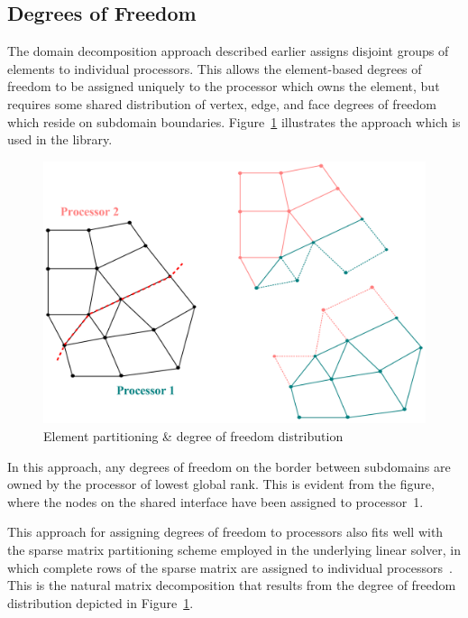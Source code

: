 \subsection{Degrees of Freedom\label{sec:dof_distribution_parallel}}
The domain decomposition approach described earlier assigns disjoint
groups of elements to individual processors.  This allows the
element-based degrees of freedom to be assigned uniquely to the
processor which owns the element, but requires some shared
distribution of vertex, edge, and face degrees of freedom which reside on subdomain boundaries.
Figure~\ref{fig:dofs_dd} illustrates the approach which is used in the
library.
\begin{figure}[hbtp]
  \begin{center}
    \includegraphics[width=\textwidth]{figures/data_structures/dofs}
    \caption{Element partitioning \& degree of freedom distribution\label{fig:dofs_dd}}
  \end{center}
\end{figure}

In this approach, any degrees of freedom on the border
between subdomains are owned by the processor of lowest
global rank.  This is evident from the figure, where the nodes on the
shared interface have been assigned to processor~1.

This approach for assigning degrees of freedom to processors also fits
well with the sparse matrix partitioning scheme employed in the underlying linear solver, in which  complete rows of the sparse matrix are assigned to individual
processors~\cite{petsc_manual}.  This is the natural matrix
decomposition that results from the degree of freedom distribution
depicted in Figure~\ref{fig:dofs_dd}.



